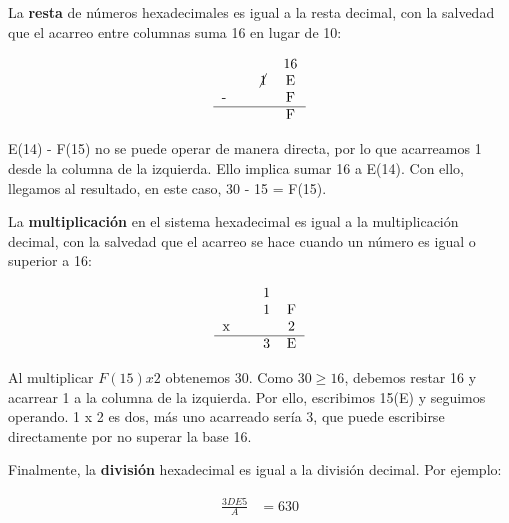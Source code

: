 La \textbf{resta} de números hexadecimales es igual a la resta decimal, con la salvedad que el acarreo entre columnas suma 16 en lugar de 10:

\begin{align*}
\begin{tabular}{cccc}
	  &   &  & 16 \\
	  &   & \cancel{1} & E \\
	- &   &   & F \\
\hline
	  &   &   & F \\
\end{tabular}
\end{align*}

E(14) - F(15) no se puede operar de manera directa, por lo que acarreamos 1 desde la columna de la izquierda. Ello implica sumar 16 a E(14). Con ello, llegamos al resultado, en este caso, 30 - 15 = F(15).

La \textbf{multiplicación} en el sistema hexadecimal es igual a la multiplicación decimal, con la salvedad que el acarreo se hace cuando un número es igual o superior a 16:

\begin{align*}
\begin{tabular}{cccc}
	  &   & 1 &   \\
	  &   & 1 & F \\
	x &   &   & 2 \\
\hline
	  &   & 3 & E \\
\end{tabular}
\end{align*}

Al multiplicar $F(15) x 2$ obtenemos 30. Como $30 \geq 16$, debemos restar 16 y acarrear 1 a la columna de la izquierda. Por ello, escribimos 15(E) y seguimos operando. 1 x 2 es dos, más uno acarreado sería 3, que puede escribirse directamente por no superar la base 16.

Finalmente, la \textbf{división} hexadecimal es igual a la división decimal. Por ejemplo:

\begin{align*}
	\frac{3DE5}{A} &= 630
\end{align*}


